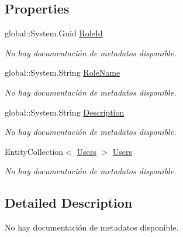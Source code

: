 \subsection*{Properties}
\begin{DoxyCompactItemize}
\item 
global\-::\-System.\-Guid \hyperlink{class_microsoft_1_1_samples_1_1_kinect_1_1_basic_interactions_1_1_roles_a270cc1c389f0efc5f0c8305f867b5e42}{Role\-Id}
\begin{DoxyCompactList}\small\item\em No hay documentación de metadatos disponible. \end{DoxyCompactList}\item 
global\-::\-System.\-String \hyperlink{class_microsoft_1_1_samples_1_1_kinect_1_1_basic_interactions_1_1_roles_ac8cc9e5363c7768b8ef19319bb76e8f3}{Role\-Name}
\begin{DoxyCompactList}\small\item\em No hay documentación de metadatos disponible. \end{DoxyCompactList}\item 
global\-::\-System.\-String \hyperlink{class_microsoft_1_1_samples_1_1_kinect_1_1_basic_interactions_1_1_roles_a238836dd90b6de59c39a45276cdc11d9}{Description}
\begin{DoxyCompactList}\small\item\em No hay documentación de metadatos disponible. \end{DoxyCompactList}\item 
Entity\-Collection$<$ \hyperlink{class_microsoft_1_1_samples_1_1_kinect_1_1_basic_interactions_1_1_users}{Users} $>$ \hyperlink{class_microsoft_1_1_samples_1_1_kinect_1_1_basic_interactions_1_1_roles_a2a10cc078afa88cd31b6edc20610b97a}{Users}
\begin{DoxyCompactList}\small\item\em No hay documentación de metadatos disponible. \end{DoxyCompactList}\end{DoxyCompactItemize}


\subsection{Detailed Description}
No hay documentación de metadatos disponible. 



